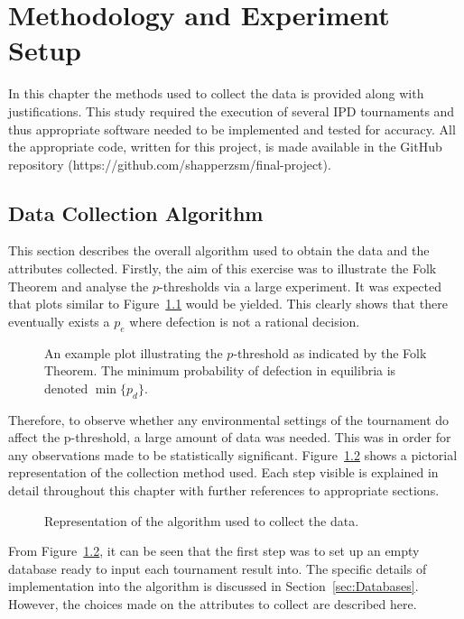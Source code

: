 \chapter{Methodology and Experiment Setup}\label{ch:Methods}
In this chapter the methods used to collect the data is provided along with
justifications. This study required the execution of several IPD tournaments and
thus appropriate software needed to be implemented and tested for accuracy. All
the appropriate code, written for this project, is made available in the GitHub
repository (https://github.com/shapperzsm/final-project).

\section{Data Collection Algorithm}\label{sec:Data_Collection_Algorithm}
This section describes the overall algorithm used to obtain the data and the
attributes collected. Firstly, the aim of this exercise was
to illustrate the Folk Theorem and analyse the \(p\)-thresholds via a large
experiment. It was expected that plots similar to Figure~\ref{fig:flk_thm_plt}
would be yielded. This clearly shows that there eventually exists a
\(p_{e}\) where defection is not a rational decision.

\begin{figure}
    \centering
    
    \caption{An example plot illustrating the \(p\)-threshold as indicated by the Folk Theorem. The minimum probability of defection in equilibria is denoted \(\min \{p_{d}\} \).}\label{fig:flk_thm_plt}
\end{figure}

Therefore, to observe whether any environmental settings of the
tournament do affect the p-threshold, a large amount of data was needed. This
was in order for any observations made to be statistically significant. Figure~\ref{fig:alg_diag} shows
a pictorial representation of the collection method used. Each step visible is
explained in detail throughout this chapter with further references to
appropriate sections.

\begin{figure}
    \centering
    \resizebox{\textwidth}{!}{}
    \caption{Representation of the algorithm used to collect the data.}\label{fig:alg_diag}
\end{figure}

From Figure~\ref{fig:alg_diag}, it can be seen that the first step was to set up an
empty database ready to input each tournament result into. 
The specific details of implementation into the algorithm is discussed in Section~\ref{sec:Databases}. However, the choices made on the attributes to
collect are described here. 

